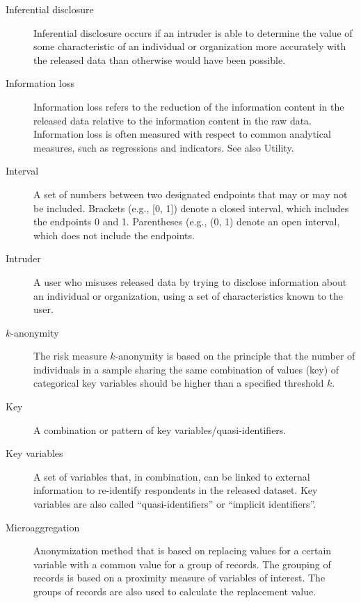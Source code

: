 \documentclass[letterpaper,10pt,english]{sphinxmanual}
\begin{document}
\begin{description}
\item[{Inferential disclosure}] \leavevmode
Inferential disclosure occurs if  an intruder is able to determine
the value of some characteristic  of an individual or organization
more accurately with the released data than otherwise would have been possible.

\item[{Information loss}] \leavevmode
Information loss refers to the reduction of the information
content in the released data   relative to the information content in the raw data.
Information loss is often measured with respect to common   analytical measures, such as
regressions and indicators. See also Utility.

\item[{Interval}] \leavevmode
A set of numbers between two   designated endpoints that may or  may not be included.
Brackets  (e.g., {[}0, 1{]}) denote a closed interval, which includes the   endpoints 0 and 1.
Parentheses (e.g., (0, 1) denote an open   interval, which does not include  the endpoints.

\item[{Intruder}] \leavevmode
A user who misuses released data  by trying to disclose information about an
individual or organization, using a set of   characteristics known to the   user.

\item[{\(k\)-anonymity}] \leavevmode
The risk measure  \(k\)-anonymity is based on   the principle that the
number of  individuals in a sample sharing   the same combination of values (key)
of categorical key  variables should be higher than a specified  threshold \(k\).

\item[{Key}] \leavevmode
A combination or pattern of key   variables/quasi-identifiers.

\item[{Key variables}] \leavevmode
A set of variables that, in combination, can be linked to  external information to
re-identify respondents in the released dataset. Key variables   are also called
“quasi-identifiers” or “implicit  identifiers”.

\item[{Microaggregation}] \leavevmode
Anonymization method that is   based on replacing values for a   certain variable
with a common value for a group of records. The grouping of records is based on a
proximity measure of variables of interest. The groups of records   are also used
to calculate the replacement value.


\end{description}
\end{document}
